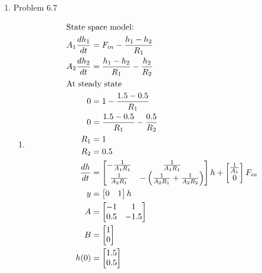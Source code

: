 \documentclass[12pt]{article}
\begin{document}
\begin{enumerate}
\newpage
\item Problem 6.7
\begin{enumerate}
    \item
    \begin{align*}
        \intertext{State space model:}
        A_1 \frac{dh_1}{dt} &= F_{in} - \frac{h_1 - h_2}{R_1} \\
        A_2 \frac{dh_2}{dt} &= \frac{h_1 - h_2}{R_1} - \frac{h_2}{R_2} \\
        \intertext{At steady state}
        0 &= 1 - \frac{1.5 - 0.5}{R_1} \\
        0 &= \frac{1.5 - 0.5}{R_1} - \frac{0.5}{R_2} \\
        R_1 &= 1 \\
        R_2 &= 0.5 \\
        \frac{dh}{dt} &= \begin{bmatrix}
            -\frac{1}{A_1 R_1} & \frac{1}{A_1 R_1} \\
            \frac{1}{A_2 R_1} & -\left(\frac{1}{A_2 R_1}+\frac{1}{A_2 R_2}\right)
        \end{bmatrix} h + \begin{bmatrix}
            \frac{1}{A_1} \\
            0 \\
        \end{bmatrix} F_{in} \\
        y &= \begin{bmatrix}
            0 & 1 \\
        \end{bmatrix} h \\
        A &= \begin{bmatrix}
            -1 & 1 \\
            0.5 & -1.5 \\
        \end{bmatrix} \\
        B &= \begin{bmatrix}
            1 \\
            0 \\
        \end{bmatrix} \\
        h(0) &= \begin{bmatrix}
            1.5 \\
            0.5 \\
        \end{bmatrix} \\

\end{align*}
\end{enumerate}
\end{enumerate}
\end{document}
